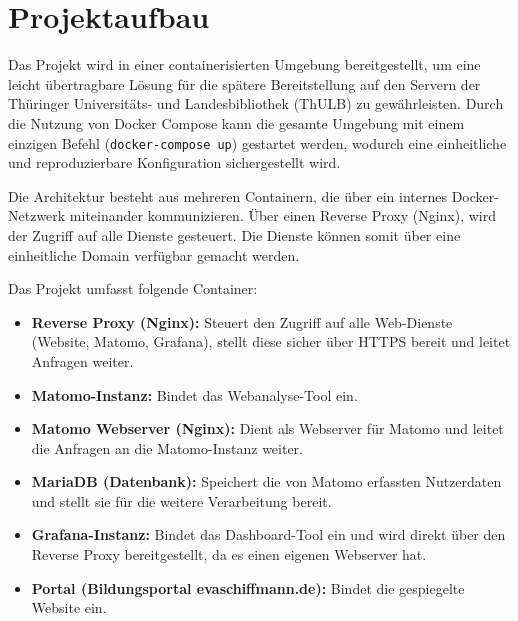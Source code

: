 \section{Projektaufbau}
\label{sec:projektaufbau}
Das Projekt wird in einer containerisierten Umgebung bereitgestellt, um eine leicht übertragbare Lösung für die spätere Bereitstellung auf den Servern der Thüringer Universitäts- und Landesbibliothek (ThULB) zu gewährleisten. Durch die Nutzung von Docker Compose kann die gesamte Umgebung mit einem einzigen Befehl (\texttt{docker-compose up}) gestartet werden, wodurch eine einheitliche und reproduzierbare Konfiguration sichergestellt wird.

Die Architektur besteht aus mehreren Containern, die über ein internes Docker-Netzwerk miteinander kommunizieren. Über einen Reverse Proxy (Nginx), wird der Zugriff auf alle Dienste gesteuert. Die Dienste können somit über eine einheitliche Domain verfügbar gemacht werden.

Das Projekt umfasst folgende Container:

\begin{itemize}
    \item \textbf{Reverse Proxy (Nginx):}  
    Steuert den Zugriff auf alle Web-Dienste (Website, Matomo, Grafana), stellt diese sicher über HTTPS bereit und leitet Anfragen weiter.

    \item \textbf{Matomo-Instanz:}  
    Bindet das Webanalyse-Tool ein.

    \item \textbf{Matomo Webserver (Nginx):}  
    Dient als Webserver für Matomo und leitet die Anfragen an die Matomo-Instanz weiter.

    \item \textbf{MariaDB (Datenbank):}  
    Speichert die von Matomo erfassten Nutzerdaten und stellt sie für die weitere Verarbeitung bereit.

    \item \textbf{Grafana-Instanz:}  
    Bindet das Dashboard-Tool ein und wird direkt über den Reverse Proxy bereitgestellt, da es einen eigenen Webserver hat.

    \item \textbf{Portal (Bildungsportal evaschiffmann.de):}  
    Bindet die gespiegelte Website ein.
\end{itemize}

